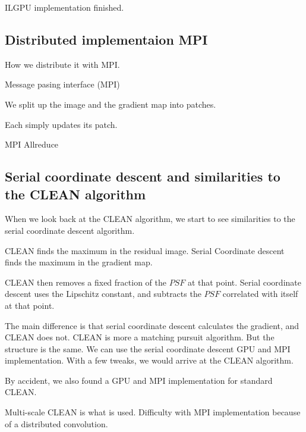 ILGPU implementation finished. 


\subsection{Distributed implementaion MPI}
How we distribute it with MPI.

Message pasing interface (MPI)


We split up the image and the gradient map into patches.

Each simply updates its patch.

MPI Allreduce


\subsection{Serial coordinate descent and similarities to the CLEAN algorithm}
When we look back at the CLEAN algorithm, we start to see similarities to the serial coordinate descent algorithm. 

CLEAN finds the maximum in the residual image. Serial Coordinate descent finds the maximum in the gradient map.

CLEAN then removes a fixed fraction of the $PSF$ at that point. Serial coordinate descent uses the Lipschitz constant, and subtracts the $PSF$ correlated with itself at that point.

The main difference is that serial coordinate descent calculates the gradient, and CLEAN does not. CLEAN is more a matching pursuit algorithm. But the structure is the same. We can use the serial coordinate descent GPU and MPI implementation. With a few tweaks, we would arrive at the CLEAN algorithm.

By accident, we also found a GPU and MPI implementation for standard CLEAN.

Multi-scale CLEAN is what is used. Difficulty with MPI implementation because of a distributed convolution.

